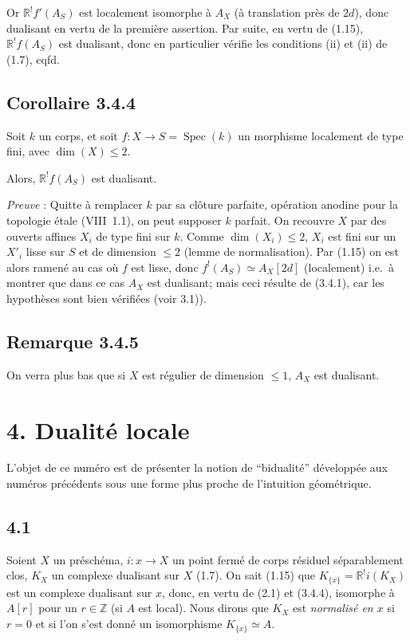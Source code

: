 \documentclass[11pt]{article}
\DeclareMathOperator{\Spec}{Spec}
\newcommand{\R}{\mathbb{R}}\newcommand{\RHomCore}{\mathbb{R}\mathrm{Hom}}
\newcommand{\Z}{\mathbb{Z}}
\providecommand{\R}{\mathrm R}
\providecommand{\Z}{\mathbb Z}
\providecommand{\Spec}{\operatorname{Spec}}
\providecommand{\Spec}{\operatorname{Spec}}
\providecommand{\Spec}{\operatorname{Spec}}
\providecommand{\Spec}{\operatorname{Spec}}
\begin{document}
Or $\R^{!}f'(A_S)$ est localement isomorphe à $A_X$ (à translation près de $2d$), donc dualisant en vertu de la première assertion. Par suite, en vertu de (1.15), $\R^{!}f(A_S)$ est dualisant, donc en particulier vérifie les conditions (ii) et (ii) de (1.7), cqfd.

\subsection*{Corollaire 3.4.4}
Soit $k$ un corps, et soit $f : X \to S = \Spec(k)$ un morphisme localement de type fini, avec $\dim(X) \leqslant 2$.

Alors, $\R^{!}f(A_S)$ est dualisant.

\emph{Preuve} : Quitte à remplacer $k$ par sa clôture parfaite, opération anodine pour la topologie étale (VIII~1.1), on peut supposer $k$ parfait. On recouvre $X$ par des ouverts affines $X_i$ de type fini sur $k$. Comme $\dim(X_i) \leqslant 2$, $X_i$ est fini sur un $X'_i$ lisse sur $S$ et de dimension $\leqslant 2$ (lemme de normalisation). Par (1.15) on est alors ramené au cas où $f$ est lisse, donc $f^{!}(A_S) \simeq A_X[2d]$ (localement) i.e.~à montrer que dans ce cas $A_X$ est dualisant; mais ceci résulte de (3.4.1), car les hypothèses sont bien vérifiées (voir 3.1)).

\subsection*{Remarque 3.4.5}
On verra plus bas que si $X$ est régulier de dimension $\leqslant 1$, $A_X$ est dualisant.

\section*{4. Dualité locale}

L'objet de ce numéro est de présenter la notion de ``bidualité'' développée aux numéros précédents sous une forme plus proche de l'intuition géométrique.

\subsection*{4.1}
Soient $X$ un préschéma, $i:x\to X$ un point fermé de corps résiduel séparablement clos, $K_X$ un complexe dualisant sur $X$ (1.7). On sait (1.15) que $K_{\{x\}}=\R^{!}i(K_X)$ est un complexe dualisant sur $x$, donc, en vertu de (2.1) et (3.4.4), isomorphe à $A[r]$ pour un $r\in\Z$ (si $A$ est local). Nous dirons que $K_X$ est \emph{normalisé en $x$} si $r=0$ et si l'on s'est donné un isomorphisme $K_{\{x\}}\simeq A$.
\end{document}
